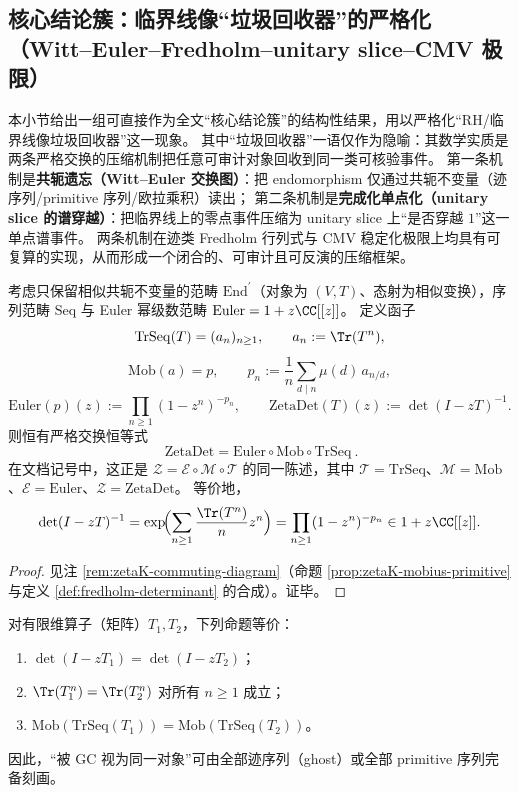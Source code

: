 \subsection{核心结论簇：临界线像“垃圾回收器”的严格化（Witt--Euler--Fredholm--unitary slice--CMV 极限）}\label{subsec:discussion-rh-garbage-collector-core}
本小节给出一组可直接作为全文“核心结论簇”的结构性结果，用以严格化“RH/临界线像垃圾回收器”这一现象。
其中“垃圾回收器”一语仅作为隐喻：其数学实质是两条严格交换的压缩机制把任意可审计对象回收到同一类可核验事件。
第一条机制是\textbf{共轭遗忘（Witt--Euler 交换图）}：把 endomorphism 仅通过共轭不变量（迹序列/primitive 序列/欧拉乘积）读出；
第二条机制是\textbf{完成化单点化（unitary slice 的谱穿越）}：把临界线上的零点事件压缩为 unitary slice 上“是否穿越 \(1\)”这一单点谱事件。
两条机制在迹类 Fredholm 行列式与 CMV 稳定化极限上均具有可复算的实现，从而形成一个闭合的、可审计且可反演的压缩框架。

\begin{theorem}\label{thm:discussion-witt-euler-gc-functor}
考虑只保留相似共轭不变量的范畴 \(\mathrm{End}^{\prime}\)（对象为 \((V,T)\)、态射为相似变换），序列范畴 \(\mathrm{Seq}\) 与 Euler 幂级数范畴 \(\mathrm{Euler}=1+z\CC[[z]]\)。
定义函子
\[
\mathrm{TrSeq}(T)=(a_n)_{n\ge 1},\qquad a_n:=\Tr(T^n),
\]
\[
\mathrm{Mob}(a)=p,\qquad p_n:=\frac{1}{n}\sum_{d\mid n}\mu(d)\,a_{n/d},
\]
\[
\mathrm{Euler}(p)(z):=\prod_{n\ge 1}(1-z^n)^{-p_n},
\qquad
\mathrm{ZetaDet}(T)(z):=\det(I-zT)^{-1}.
\]
则恒有严格交换恒等式
\[
\boxed{\ \mathrm{ZetaDet}=\mathrm{Euler}\circ\mathrm{Mob}\circ\mathrm{TrSeq}\ }.
\]
在文档记号中，这正是 \(\mathcal Z=\mathcal E\circ\mathcal M\circ\mathcal T\) 的同一陈述，其中 \(\mathcal T=\mathrm{TrSeq}\)、\(\mathcal M=\mathrm{Mob}\)、\(\mathcal E=\mathrm{Euler}\)、\(\mathcal Z=\mathrm{ZetaDet}\)。
等价地，
\[
\det(I-zT)^{-1}
=\exp\!\Bigl(\sum_{n\ge 1}\frac{\Tr(T^n)}{n}z^n\Bigr)
=\prod_{n\ge 1}(1-z^n)^{-p_n}\in 1+z\CC[[z]].
\]
\end{theorem}

\begin{proof}
见注 \ref{rem:zetaK-commuting-diagram}（命题 \ref{prop:zetaK-mobius-primitive} 与定义 \ref{def:fredholm-determinant} 的合成）。证毕。
\end{proof}

\begin{corollary}[GC 等价关系的完备刻画]\label{cor:discussion-gc-equivalence-characterization}
对有限维算子（矩阵）\(T_1,T_2\)，下列命题等价：
\begin{enumerate}
  \item \(\det(I-zT_1)=\det(I-zT_2)\)；
  \item \(\Tr(T_1^n)=\Tr(T_2^n)\) 对所有 \(n\ge 1\) 成立；
  \item \(\mathrm{Mob}(\mathrm{TrSeq}(T_1))=\mathrm{Mob}(\mathrm{TrSeq}(T_2))\)。
\end{enumerate}
因此，“被 GC 视为同一对象”可由全部迹序列（ghost）或全部 primitive 序列完备刻画。
\end{corollary}

